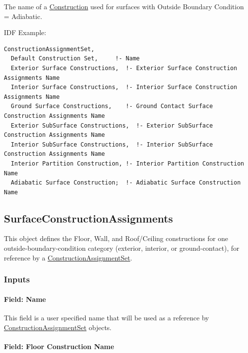 The name of a \hyperref[construction-000]{Construction} used for surfaces with Outside Boundary Condition = Adiabatic.

IDF Example:

\begin{lstlisting}
ConstructionAssignmentSet,
  Default Construction Set,     !- Name
  Exterior Surface Constructions,  !- Exterior Surface Construction Assignments Name
  Interior Surface Constructions,  !- Interior Surface Construction Assignments Name
  Ground Surface Constructions,    !- Ground Contact Surface Construction Assignments Name
  Exterior SubSurface Constructions,  !- Exterior SubSurface Construction Assignments Name
  Interior SubSurface Constructions,  !- Interior SubSurface Construction Assignments Name
  Interior Partition Construction, !- Interior Partition Construction Name
  Adiabatic Surface Construction;  !- Adiabatic Surface Construction Name
\end{lstlisting}

\subsection{SurfaceConstructionAssignments}\label{surfaceconstructionassignments}

This object defines the Floor, Wall, and Roof/Ceiling constructions for one outside-boundary-condition category (exterior, interior, or ground-contact), for reference by a \hyperref[constructionassignmentset]{ConstructionAssignmentSet}.

\subsubsection{Inputs}\label{surfaceconstructionassignments-inputs}

\paragraph{Field: Name}\label{surfaceconstructionassignments-field-name}

This field is a user specified name that will be used as a reference by \hyperref[constructionassignmentset]{ConstructionAssignmentSet} objects.

\paragraph{Field: Floor Construction Name}\label{surfaceconstructionassignments-field-floor-construction-name}

